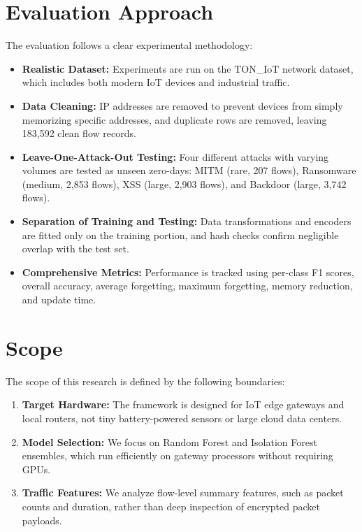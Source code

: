 \section{Evaluation Approach}
\label{sec:evaluation_approach}

The evaluation follows a clear experimental methodology:
\begin{itemize}
    \item \textbf{Realistic Dataset:} Experiments are run on the TON\_IoT network dataset, which includes both modern IoT devices and industrial traffic.
    \item \textbf{Data Cleaning:} IP addresses are removed to prevent devices from simply memorizing specific addresses, and duplicate rows are removed, leaving 183,592 clean flow records.
    \item \textbf{Leave-One-Attack-Out Testing:} Four different attacks with varying volumes are tested as unseen zero-days: MITM (rare, 207 flows), Ransomware (medium, 2,853 flows), XSS (large, 2,903 flows), and Backdoor (large, 3,742 flows).
    \item \textbf{Separation of Training and Testing:} Data transformations and encoders are fitted only on the training portion, and hash checks confirm negligible overlap with the test set.
    \item \textbf{Comprehensive Metrics:} Performance is tracked using per-class F1 scores, overall accuracy, average forgetting, maximum forgetting, memory reduction, and update time.
\end{itemize}

\section{Scope}
\label{sec:scope_study}

The scope of this research is defined by the following boundaries:
\begin{enumerate}
    \item \textbf{Target Hardware:} The framework is designed for IoT edge gateways and local routers, not tiny battery-powered sensors or large cloud data centers.
    \item \textbf{Model Selection:} We focus on Random Forest and Isolation Forest ensembles, which run efficiently on gateway processors without requiring GPUs.
    \item \textbf{Traffic Features:} We analyze flow-level summary features, such as packet counts and duration, rather than deep inspection of encrypted packet payloads.
\end{enumerate}

